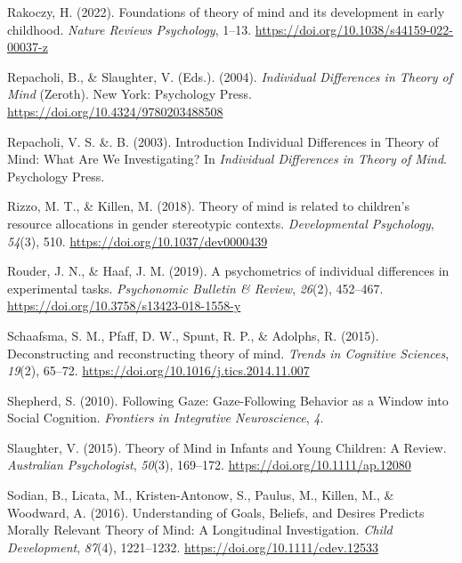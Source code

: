 \documentclass[
  man,floatsintext]{apa6}
\newlength{\cslhangindent}
\newlength{\cslentryspacingunit} %
\newenvironment{CSLReferences}[2] %
 {%
  \setlength{\parindent}{0pt}
  \ifodd #1
  \let\oldpar\par
  \def\par{\hangindent=\cslhangindent\oldpar}
  \fi
  \setlength{\parskip}{#2\cslentryspacingunit}
 }%
 {}
\begin{document}
\begin{CSLReferences}{1}{0}
\leavevmode{}%
Rakoczy, H. (2022). Foundations of theory of mind and its development in early childhood. \emph{Nature Reviews Psychology}, 1--13. \url{https://doi.org/10.1038/s44159-022-00037-z}

\leavevmode{}%
Repacholi, B., \& Slaughter, V. (Eds.). (2004). \emph{Individual {Differences} in {Theory} of {Mind}} (Zeroth). {New York}: {Psychology Press}. \url{https://doi.org/10.4324/9780203488508}

\leavevmode{}%
Repacholi, V. S. \&. B. (2003). Introduction {Individual Differences} in {Theory} of {Mind}: {What Are We Investigating}? In \emph{Individual {Differences} in {Theory} of {Mind}}. {Psychology Press}.

\leavevmode{}%
Rizzo, M. T., \& Killen, M. (2018). Theory of mind is related to children's resource allocations in gender stereotypic contexts. \emph{Developmental Psychology}, \emph{54}(3), 510. \url{https://doi.org/10.1037/dev0000439}

\leavevmode{}%
Rouder, J. N., \& Haaf, J. M. (2019). A psychometrics of individual differences in experimental tasks. \emph{Psychonomic Bulletin \& Review}, \emph{26}(2), 452--467. \url{https://doi.org/10.3758/s13423-018-1558-y}

\leavevmode{}%
Schaafsma, S. M., Pfaff, D. W., Spunt, R. P., \& Adolphs, R. (2015). Deconstructing and reconstructing theory of mind. \emph{Trends in Cognitive Sciences}, \emph{19}(2), 65--72. \url{https://doi.org/10.1016/j.tics.2014.11.007}

\leavevmode{}%
Shepherd, S. (2010). Following {Gaze}: {Gaze-Following Behavior} as a {Window} into {Social Cognition}. \emph{Frontiers in Integrative Neuroscience}, \emph{4}.

\leavevmode{}%
Slaughter, V. (2015). Theory of {Mind} in {Infants} and {Young Children}: {A Review}. \emph{Australian Psychologist}, \emph{50}(3), 169--172. \url{https://doi.org/10.1111/ap.12080}

\leavevmode{}%
Sodian, B., Licata, M., Kristen-Antonow, S., Paulus, M., Killen, M., \& Woodward, A. (2016). Understanding of {Goals}, {Beliefs}, and {Desires Predicts Morally Relevant Theory} of {Mind}: {A Longitudinal Investigation}. \emph{Child Development}, \emph{87}(4), 1221--1232. \url{https://doi.org/10.1111/cdev.12533}


\end{CSLReferences}
\end{document}
